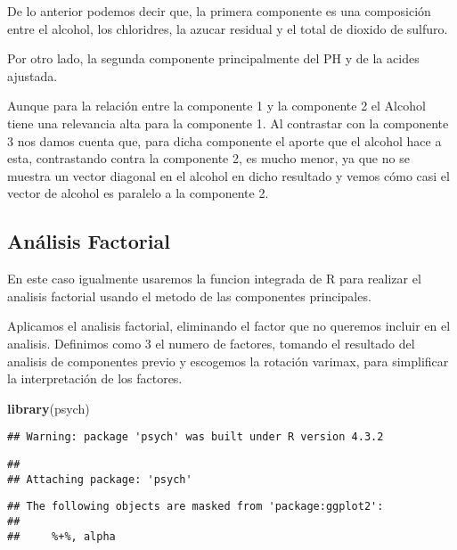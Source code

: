 \documentclass[
]{article}
\newenvironment{Shaded}{\begin{snugshade}}{\end{snugshade}}
\newcommand{\AttributeTok}[1]{\textcolor[rgb]{0.13,0.29,0.53}{#1}}
\newcommand{\DecValTok}[1]{\textcolor[rgb]{0.00,0.00,0.81}{#1}}
\newcommand{\FunctionTok}[1]{\textcolor[rgb]{0.13,0.29,0.53}{\textbf{#1}}}
\newcommand{\NormalTok}[1]{#1}
\newcommand{\OtherTok}[1]{\textcolor[rgb]{0.56,0.35,0.01}{#1}}
\newcommand{\SpecialCharTok}[1]{\textcolor[rgb]{0.81,0.36,0.00}{\textbf{#1}}}
\newcommand{\StringTok}[1]{\textcolor[rgb]{0.31,0.60,0.02}{#1}}
\begin{document}
De lo anterior podemos decir que, la primera componente es una
composición entre el alcohol, los chloridres, la azucar residual y el
total de dioxido de sulfuro.

Por otro lado, la segunda componente principalmente del PH y de la
acides ajustada.

Aunque para la relación entre la componente 1 y la componente 2 el
Alcohol tiene una relevancia alta para la componente 1. Al contrastar
con la componente 3 nos damos cuenta que, para dicha componente el
aporte que el alcohol hace a esta, contrastando contra la componente 2,
es mucho menor, ya que no se muestra un vector diagonal en el alcohol en
dicho resultado y vemos cómo casi el vector de alcohol es paralelo a la
componente 2.

\hypertarget{anuxe1lisis-factorial}{%
\subsection{Análisis Factorial}\label{anuxe1lisis-factorial}}

En este caso igualmente usaremos la funcion integrada de R para realizar
el analisis factorial usando el metodo de las componentes principales.

Aplicamos el analisis factorial, eliminando el factor que no queremos
incluir en el analisis. Definimos como 3 el numero de factores, tomando
el resultado del analisis de componentes previo y escogemos la rotación
varimax, para simplificar la interpretación de los factores.

\begin{Shaded}
\begin{Highlighting}[]
\FunctionTok{library}\NormalTok{(psych)}
\end{Highlighting}
\end{Shaded}

\begin{verbatim}
## Warning: package 'psych' was built under R version 4.3.2
\end{verbatim}

\begin{verbatim}
## 
## Attaching package: 'psych'
\end{verbatim}

\begin{verbatim}
## The following objects are masked from 'package:ggplot2':
## 
##     %+%, alpha
\end{verbatim}

\begin{Shaded}
\end{Shaded}
\end{document}

